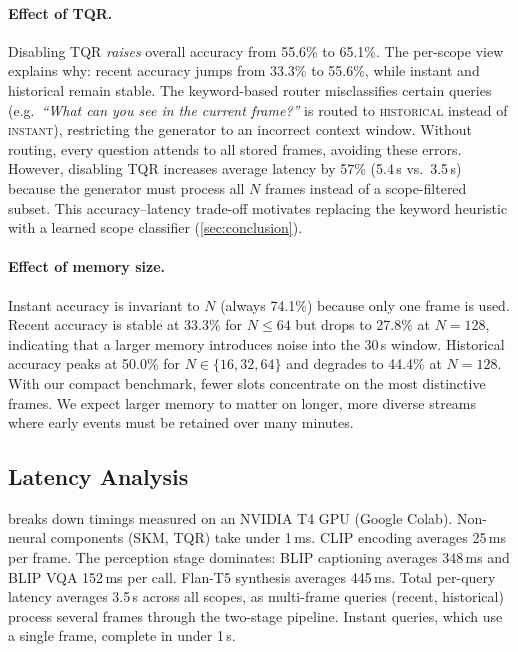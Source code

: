\paragraph{Effect of TQR.}
Disabling TQR \emph{raises} overall accuracy from 55.6\% to 65.1\%.
The per-scope view explains why: recent accuracy jumps from 33.3\% to 55.6\%, while instant and historical remain stable.
The keyword-based router misclassifies certain queries (e.g.\ \emph{``What can you see in the current frame?''} is routed to \textsc{historical} instead of \textsc{instant}), restricting the generator to an incorrect context window.
Without routing, every question attends to all stored frames, avoiding these errors.
However, disabling TQR increases average latency by 57\% (5.4\,s vs.\ 3.5\,s) because the generator must process all $N$ frames instead of a scope-filtered subset.
This accuracy--latency trade-off motivates replacing the keyword heuristic with a learned scope classifier (\cref{sec:conclusion}).

\paragraph{Effect of memory size.}
Instant accuracy is invariant to $N$ (always 74.1\%) because only one frame is used.
Recent accuracy is stable at 33.3\% for $N \le 64$ but drops to 27.8\% at $N\!=\!128$, indicating that a larger memory introduces noise into the 30\,s window.
Historical accuracy peaks at 50.0\% for $N \in \{16, 32, 64\}$ and degrades to 44.4\% at $N\!=\!128$.
With our compact benchmark, fewer slots concentrate on the most distinctive frames.
We expect larger memory to matter on longer, more diverse streams where early events must be retained over many minutes.


\subsection{Latency Analysis}
\label{sec:latency}

 breaks down timings measured on an NVIDIA T4 GPU (Google Colab).
Non-neural components (SKM, TQR) take under 1\,ms.
CLIP encoding averages 25\,ms per frame.
The perception stage dominates: BLIP captioning averages 348\,ms and BLIP VQA 152\,ms per call.
Flan-T5 synthesis averages 445\,ms.
Total per-query latency averages 3.5\,s across all scopes, as multi-frame queries (recent, historical) process several frames through the two-stage pipeline. Instant queries, which use a single frame, complete in under 1\,s.

